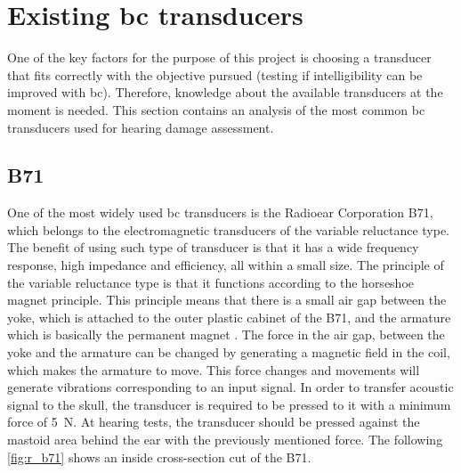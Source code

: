 \section{Existing \gls{bc} transducers}
One of the key factors for the purpose of this project is choosing a transducer that fits correctly with the objective pursued (testing if intelligibility can be improved with \gls{bc}). Therefore, knowledge about the available transducers at the moment is needed. %
This section contains an analysis of the most common \gls{bc} transducers used for hearing damage assessment. %

\subsection{B71}
One of the most widely used \gls{bc} transducers is the Radioear Corporation B71, which belongs to the electromagnetic transducers of the variable reluctance type. The benefit of using such type of transducer is that it has a wide frequency response, high impedance and efficiency, all within a small size. The principle of the variable reluctance type is that it functions according to the horseshoe magnet principle. This principle means that there is a small air gap between the yoke, which is attached to the outer plastic cabinet of the B71, and the armature which is basically the permanent magnet \citep{the_balanced_2003}. The force in the air gap, between the yoke and the armature can be changed by generating a magnetic field in the coil, which makes the armature to move. This force changes and movements will generate vibrations corresponding to an input signal. In order to transfer acoustic signal to the skull, the transducer is required to be pressed to it with a minimum force of \SI{5}{\newton}. At hearing tests, the transducer should be pressed against the mastoid area behind the ear with the previously mentioned force. The following \autoref{fig:r_b71} shows an inside cross-section cut of the B71.



